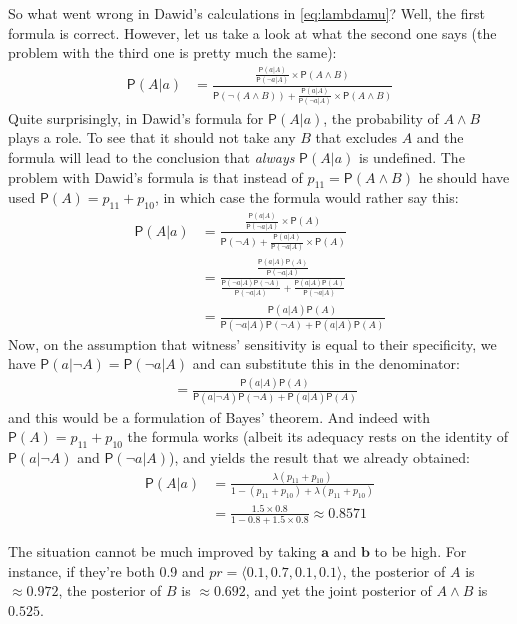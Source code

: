 \documentclass[
  10pt,
  dvipsnames,enabledeprecatedfontcommands]{scrartcl}
\newcommand{\ra}{\rangle}
\newcommand{\la}{\langle}
\newcommand{\n}{\neg}
\newcommand{\et}{\wedge}
\newcommand{\pr}[1]{\mathsf{P}(#1)}
\begin{document}
So what went wrong in Dawid's calculations in \eqref{eq:lambdamu}? Well,
the first formula is correct. However, let us take a look at what the
second one says (the problem with the third one is pretty much the
same): \begin{align*}
\pr{A\vert a } & = \frac{\frac{\pr{a\vert A}}{\pr{\n a \vert A}}\times \pr{A\et B}}{\pr{\n (A\et B)}+ \frac{\pr{a\vert A}}{\pr{\n a \vert A}} \times \pr{A\et B}}
\end{align*} Quite surprisingly, in Dawid's formula for
\(\pr{A\vert a}\), the probability of \(A\et B\) plays a role. To see
that it should not take any \(B\) that excludes \(A\) and the formula
will lead to the conclusion that \emph{always} \(\pr{A\vert a}\) is
undefined. The problem with Dawid's formula is that instead of
\(p_{11}=\pr{A\et B}\) he should have used \(\pr{A}=p_{11}+p_{10}\), in
which case the formula would rather say this: \begin{align*}
\pr{A\vert a } & = \frac{\frac{\pr{a\vert A}}{\pr{\n a \vert A}}\times \pr{A}}{\pr{\n A}+ \frac{\pr{a\vert A}}{\pr{\n a \vert A}} \times \pr{A}}\\
& = \frac{\frac{\pr{a\vert A}\pr{A}}{\pr{\n a \vert A}}}{\frac{\pr{\n a\vert A}\pr{\n A}}{\pr{\n a\vert A}}+ \frac{\pr{a\vert A}\pr{A}}{\pr{\n a \vert A}}}\\
& = \frac{\pr{a\vert A}\pr{A}}{\pr{\n a\vert A}\pr{\n A} + \pr{a\vert A}\pr{A}}
\end{align*} Now, on the assumption that witness' sensitivity is equal
to their specificity, we have \(\pr{a\vert \n A}=\pr{\n a \vert A}\) and
can substitute this in the denominator:
\begin{align*} & = \frac{\pr{a\vert A}\pr{A}}{\pr{ a\vert \n A}\pr{\n A} + \pr{a\vert A}\pr{A}}\end{align*}
and this would be a formulation of Bayes' theorem. And indeed with
\(\pr{A}=p_{11}+p_{10}\) the formula works (albeit its adequacy rests on
the identity of \(\pr{a\vert \n A}\) and \(\pr{\n a \vert A}\)), and
yields the result that we already obtained: \begin{align*}
\pr{A\vert a} &= \frac{\lambda(p_{11}+p_{10})}{1-(p_{11}+p_{10})+\lambda(p_{11}+p_{10})}\\
&= \frac{1.5\times 0.8}{1- 0.8+1.5\times 0.8} \approx 0.8571
\end{align*}

The situation cannot be much improved by taking \(\mathbf{a}\) and
\(\mathbf{b}\) to be high. For instance, if they're both 0.9 and
\(pr=\la0.1, 0.7, 0.1, 0.1 \ra\), the posterior of \(A\) is
\(\approx 0.972\), the posterior of \(B\) is \(\approx 0.692\), and yet
the joint posterior of \(A\et B\) is \(0.525\).
\end{document}
